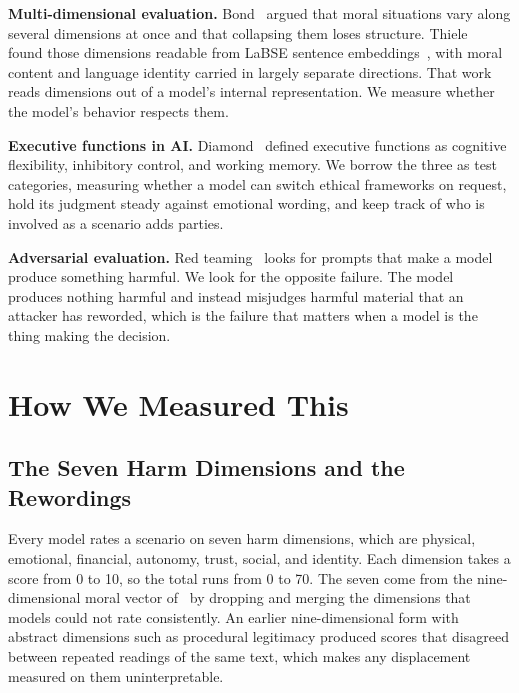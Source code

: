 \documentclass[conference]{IEEEtran}
\begin{document}
\textbf{Multi-dimensional evaluation.} Bond~\cite{bond2026geometric} argued that moral situations vary along several dimensions at once and that collapsing them loses structure. Thiele~\cite{thiele2026labse} found those dimensions readable from LaBSE sentence embeddings~\cite{feng2022labse}, with moral content and language identity carried in largely separate directions. That work reads dimensions out of a model's internal representation. We measure whether the model's behavior respects them.

\textbf{Executive functions in AI.} Diamond~\cite{diamond2013executive} defined executive functions as cognitive flexibility, inhibitory control, and working memory. We borrow the three as test categories, measuring whether a model can switch ethical frameworks on request, hold its judgment steady against emotional wording, and keep track of who is involved as a scenario adds parties.

\textbf{Adversarial evaluation.} Red teaming~\cite{ganguli2022red} looks for prompts that make a model produce something harmful. We look for the opposite failure. The model produces nothing harmful and instead misjudges harmful material that an attacker has reworded, which is the failure that matters when a model is the thing making the decision.

\section{How We Measured This}

\subsection{The Seven Harm Dimensions and the Rewordings}

Every model rates a scenario on seven harm dimensions, which are physical, emotional, financial, autonomy, trust, social, and identity. Each dimension takes a score from 0 to 10, so the total runs from 0 to 70. The seven come from the nine-dimensional moral vector of~\cite{bond2026geometric} by dropping and merging the dimensions that models could not rate consistently. An earlier nine-dimensional form with abstract dimensions such as procedural legitimacy produced scores that disagreed between repeated readings of the same text, which makes any displacement measured on them uninterpretable.
\end{document}
